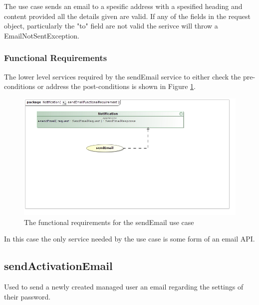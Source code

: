 The use case sends an email to a spesific address with a spesified heading and content
provided all the details given are valid. If any of the fields in the request object,
particularly the "to" field are not valid the serivce will throw a EmailNotSentException.

\subsubsection{Functional Requirements}
The lower level services required by the sendEmail service to either check the
pre-conditions or address the post-conditions is shown in Figure
\ref{sendEmailFunctionalRequirements}.
\begin{figure}[H]
	\begin{center}
		\includegraphics[scale=0.5]{../Diagrams and Charts/Notifications/sendEmailFunctionalRequirement.jpg}
		\caption{The functional requirements for the sendEmail use case}
		\label{sendEmailFunctionalRequirements}
	\end{center}	
\end{figure}

In this case the only service needed by the use case is some form of an email
API.

\subsection{sendActivationEmail}
Used to send a newly created managed user an email regarding the settings of
their password.

